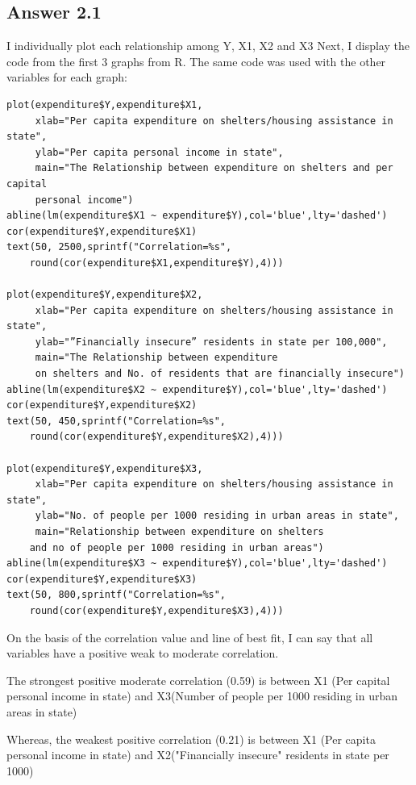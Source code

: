\documentclass{article}
\begin{document}
\subsection{Answer 2.1}
I individually plot each relationship among Y, X1, X2 and X3
Next, I display the code from the first 3 graphs from R. The same code was used with the other variables for each graph:
\begin{verbatim}
plot(expenditure$Y,expenditure$X1,
     xlab="Per capita expenditure on shelters/housing assistance in state",
     ylab="Per capita personal income in state",
     main="The Relationship between expenditure on shelters and per capital 
     personal income")
abline(lm(expenditure$X1 ~ expenditure$Y),col='blue',lty='dashed')
cor(expenditure$Y,expenditure$X1)
text(50, 2500,sprintf("Correlation=%s",
    round(cor(expenditure$X1,expenditure$Y),4)))

plot(expenditure$Y,expenditure$X2,
     xlab="Per capita expenditure on shelters/housing assistance in state",
     ylab="”Financially insecure” residents in state per 100,000",
     main="The Relationship between expenditure 
     on shelters and No. of residents that are financially insecure")
abline(lm(expenditure$X2 ~ expenditure$Y),col='blue',lty='dashed')
cor(expenditure$Y,expenditure$X2)
text(50, 450,sprintf("Correlation=%s",          
    round(cor(expenditure$Y,expenditure$X2),4)))

plot(expenditure$Y,expenditure$X3,
     xlab="Per capita expenditure on shelters/housing assistance in state",
     ylab="No. of people per 1000 residing in urban areas in state",
     main="Relationship between expenditure on shelters 
    and no of people per 1000 residing in urban areas")
abline(lm(expenditure$X3 ~ expenditure$Y),col='blue',lty='dashed')
cor(expenditure$Y,expenditure$X3)
text(50, 800,sprintf("Correlation=%s", 
    round(cor(expenditure$Y,expenditure$X3),4)))
\end{verbatim}

\noindent On the basis of the correlation value and line of best fit, I can say that all variables have a positive weak to moderate correlation.

\noindent The strongest positive moderate correlation (0.59) is between X1 (Per capital personal income in state) and X3(Number of people per 1000 residing in urban areas in state)

\noindent Whereas, the weakest positive correlation (0.21) is between X1 (Per capita personal income in state) and X2("Financially insecure" residents in state per 1000)
\end{document}
